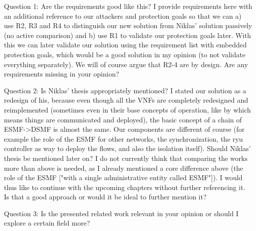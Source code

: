 \documentclass{article}
\begin{document}
Question 1: Are the requirements good like this? I provide requirements here with an additional reference to our attackers and protection goals so that we can a) use R2, R3 and R4 to distinguish our new solution from Niklas' solution passively (no active comparison) and b) use R1 to validate our protection goals later. With this we can later validate our solution using the requirement list with embedded protection goals, which would be a good solution in my opinion (to not validate everything separately). We will of course argue that R2-4 are by design. Are any requirements missing in your opinion?

Question 2: Is Niklas' thesis appropriately mentioned? I stated our solution as a redesign of his, because even though all the VNFs are completely redesigned and reimplemented (sometimes even in their base concepts of operation, like by which means things are communicated and deployed), the basic concept of a chain of ESMF->DSMF is almost the same. Our components are different of course (for example the role of the ESMF for other networks, the synchronization, the ryu controller as way to deploy the flows, and also the isolation itself). Should Niklas' thesis be mentioned later on? I do not currently think that comparing the works more than above is needed, as I already mentioned a core difference above (the role of the ESMF ["with a single administrative entity called ESMF"]). I would thus like to continue with the upcoming chapters without further referencing it. Is that a good approach or would it be ideal to further mention it?

Question 3: Is the presented related work relevant in your opinion or should I explore a certain field more?
\end{document}
